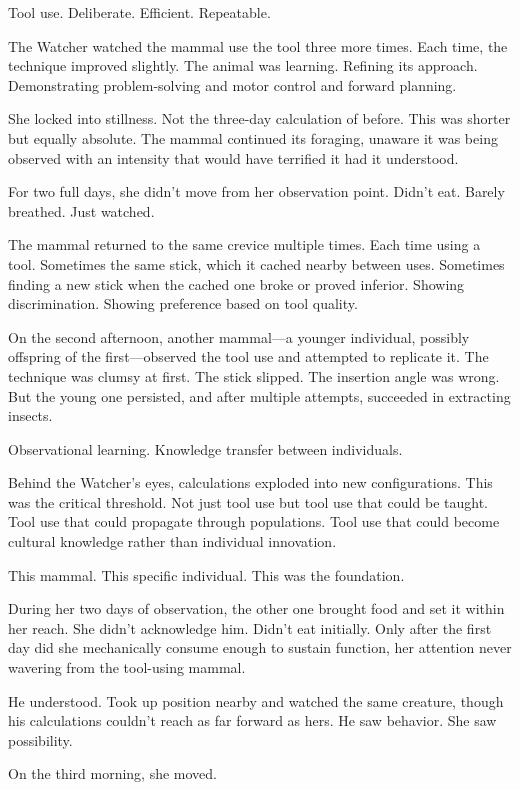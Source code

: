 Tool use. Deliberate. Efficient. Repeatable.

The Watcher watched the mammal use the tool three more times. Each time, the technique improved slightly. The animal was learning. Refining its approach. Demonstrating problem-solving and motor control and forward planning.

She locked into stillness. Not the three-day calculation of before. This was shorter but equally absolute. The mammal continued its foraging, unaware it was being observed with an intensity that would have terrified it had it understood.

For two full days, she didn't move from her observation point. Didn't eat. Barely breathed. Just watched.

The mammal returned to the same crevice multiple times. Each time using a tool. Sometimes the same stick, which it cached nearby between uses. Sometimes finding a new stick when the cached one broke or proved inferior. Showing discrimination. Showing preference based on tool quality.

On the second afternoon, another mammal—a younger individual, possibly offspring of the first—observed the tool use and attempted to replicate it. The technique was clumsy at first. The stick slipped. The insertion angle was wrong. But the young one persisted, and after multiple attempts, succeeded in extracting insects.

Observational learning. Knowledge transfer between individuals.

Behind the Watcher's eyes, calculations exploded into new configurations. This was the critical threshold. Not just tool use but tool use that could be taught. Tool use that could propagate through populations. Tool use that could become cultural knowledge rather than individual innovation.

This mammal. This specific individual. This was the foundation.

During her two days of observation, the other one brought food and set it within her reach. She didn't acknowledge him. Didn't eat initially. Only after the first day did she mechanically consume enough to sustain function, her attention never wavering from the tool-using mammal.

He understood. Took up position nearby and watched the same creature, though his calculations couldn't reach as far forward as hers. He saw behavior. She saw possibility.

On the third morning, she moved.

